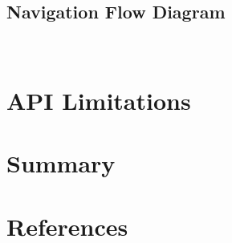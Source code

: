 \documentclass[11pt,english,numbers=endperiod,parskip=half]{scrartcl}
\begin{document}
  \subsection{Navigation Flow Diagram}
    \begin{figure}[H]
      \\
    \end{figure}

\section{API Limitations}

\section{Summary}
\section{References}
\end{document}
